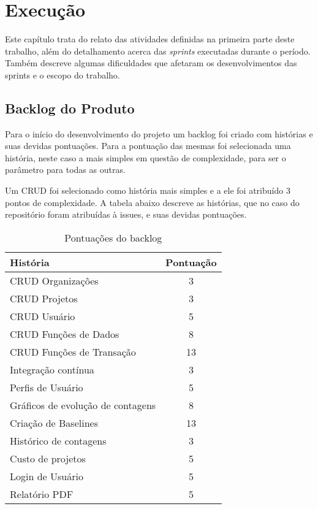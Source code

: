 \chapter[Execução]{Execução}

Este capítulo trata do relato das atividades definidas na primeira parte deste trabalho, além do detalhamento acerca das \textit{sprints} executadas durante o período. Também descreve algumas dificuldades que afetaram os desenvolvimentos das sprints e o escopo do trabalho.

\section{Backlog do Produto}

Para o início do desenvolvimento do projeto um backlog foi criado com histórias e suas devidas pontuações. Para a pontuação das mesmas foi selecionada uma história, neste caso a mais simples em questão de complexidade, para ser o parâmetro para todas as outras.

Um CRUD foi selecionado como história mais simples e a ele foi atribuído 3 pontos de complexidade. A tabela abaixo descreve as histórias, que no caso do repositório foram atribuídas à issues, e suas devidas pontuações.

\begin{table}[h]
\centering
\label{backlog}
\begin{tabular}{|l|c|}
\hline
\textbf{História}                 & \textbf{Pontuação} \\ \hline
CRUD Organizações                 & 3                  \\ \hline
CRUD Projetos                     & 3                  \\ \hline
CRUD Usuário                      & 5                  \\ \hline
CRUD Funções de Dados             & 8                  \\ \hline
CRUD Funções de Transação         & 13                 \\ \hline
Integração contínua               & 3                  \\ \hline
Perfis de Usuário                 & 5                  \\ \hline
Gráficos de evolução de contagens & 8                  \\ \hline
Criação de Baselines              & 13                 \\ \hline
Histórico de contagens            & 3                  \\ \hline
Custo de projetos                 & 5                  \\ \hline
Login de Usuário                  & 5                  \\ \hline
Relatório PDF                     & 5                  \\ \hline
\end{tabular}
\caption{Pontuações do backlog}
\end{table}

